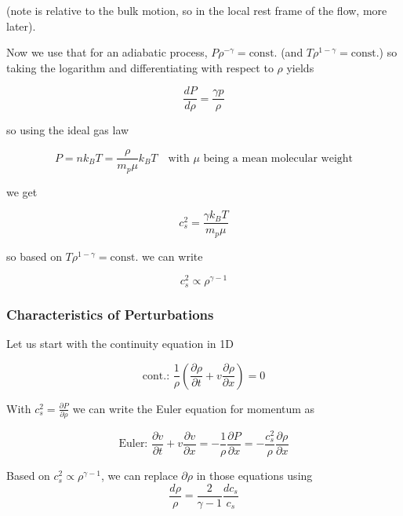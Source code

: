 (note is relative to the bulk motion, so in the local rest frame of the flow, more later).

Now we use that for an adiabatic process, $P \rho^{-\gamma} = \text{const.}$ (and $T\rho^{1-\gamma} = \text{const.}$) so taking the logarithm and differentiating with respect to $\rho$ yields

\begin{equation}
    \frac{dP}{d\rho} = \frac{\gamma p}{\rho}
\end{equation}

so using the ideal gas law

\begin{equation}
    P = n k_B T = \frac{\rho}{m_p \mu} k_B T \quad \text{with } \mu \text{ being a mean molecular weight}
\end{equation}

we get

\begin{equation}
    c_s^2 = \frac{\gamma k_B T}{m_p \mu}
\end{equation}

so based on $T\rho^{1-\gamma} = \text{const.}$ we can write

\begin{equation}
    c_s^2 \propto \rho^{\gamma - 1}
\end{equation}

\subsubsection{Characteristics of Perturbations}
Let us start with the continuity equation in 1D

\begin{equation}
    \text{cont.: }\frac{1}{\rho} \left( \frac{\partial \rho}{\partial t} + v \frac{\partial \rho}{\partial x} \right) = 0
\end{equation}

With $c_s^2 = \frac{\partial P}{\partial \rho}$ we can write the Euler equation for momentum as

\begin{equation}
    \text{Euler: } \frac{\partial v}{\partial t} + v \frac{\partial v}{\partial x} = -\frac{1}{\rho} \frac{\partial P}{\partial x} = -\frac{c_s^2}{\rho} \frac{\partial \rho}{\partial x}
\end{equation}

Based on $c_s^2 \propto \rho^{\gamma - 1}$, we can replace $\partial \rho$ in those equations using
\begin{equation}
    \frac{d\rho}{\rho} = \frac{2}{\gamma - 1} \frac{dc_s}{c_s}
\end{equation}

